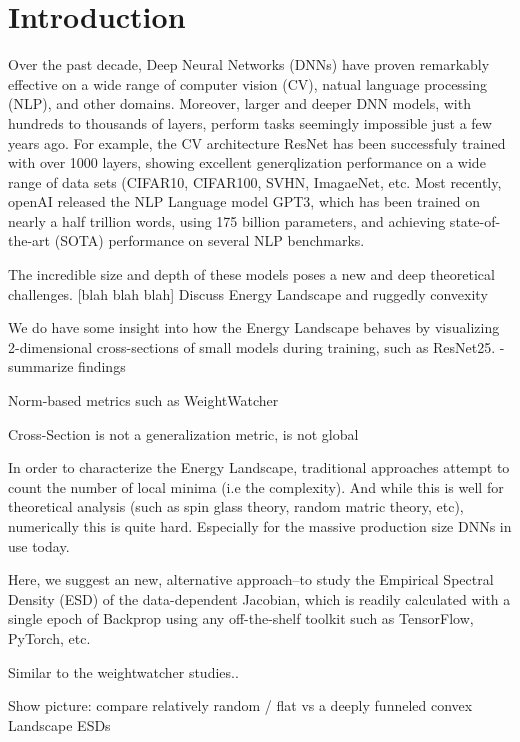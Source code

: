 \section{Introduction}
\label{sxn:intro}

Over the past decade, Deep Neural Networks (DNNs) have proven remarkably effective on a wide range of 
computer vision (CV), natual language processing (NLP), and other domains.  
Moreover, larger and deeper DNN models, with hundreds to thousands of layers, perform tasks
seemingly impossible just a few years ago.  
For example, the CV architecture ResNet has been successfuly trained with over 1000 layers,
showing excellent generqlization performance on a wide range of data sets (CIFAR10, CIFAR100, SVHN, ImagaeNet, etc.
Most recently, openAI released the NLP Language model GPT3, which has been trained on nearly a half trillion words,
using 175 billion parameters, and achieving state-of-the-art (SOTA) performance on several NLP
benchmarks.  

The incredible size and depth of these models poses a new and deep theoretical challenges.
[blah blah blah]
Discuss Energy Landscape and  ruggedly convexity


We do have some insight into how the Energy Landscape behaves by visualizing 2-dimensional
cross-sections of small models during training, such as ResNet25.
-summarize findings

Norm-based metrics such as WeightWatcher

Cross-Section is not a generalization metric, is not global

In order to characterize the Energy Landscape, traditional approaches attempt to count
the number of local minima (i.e the complexity).  And while this is well for theoretical
analysis (such as spin glass theory, random matric theory, etc), numerically this
is quite hard.  Especially for the massive production size DNNs in use today.

Here, we suggest an new, alternative approach--to study the Empirical Spectral Density (ESD)
of the data-dependent Jacobian, which is readily calculated with a single epoch of Backprop
using any off-the-shelf toolkit such as TensorFlow, PyTorch, etc. 

Similar to the weightwatcher studies..

Show picture:  compare relatively random / flat vs  a deeply funneled convex Landscape ESDs

